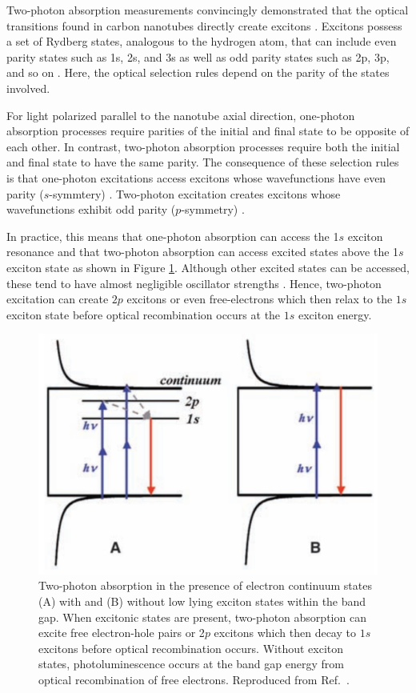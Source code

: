 Two-photon absorption measurements convincingly demonstrated that the optical transitions found in carbon nanotubes directly create excitons \cite{wang2005optical, maultzsch2005exciton}. Excitons possess a set of Rydberg states, analogous to the hydrogen atom, that can include even parity states such as 1s, 2s, and 3s as well as odd parity states such as 2p, 3p, and so on \cite{wang2005optical}. Here, the optical selection rules depend on the parity of the states involved.

For light polarized parallel to the nanotube axial direction, one-photon absorption processes require parities of the initial and final state to be opposite of each other. In contrast, two-photon absorption processes require both the initial and final state to have the same parity. The consequence of these selection rules is that one-photon excitations access excitons whose wavefunctions have even parity ($s$-symmtery) \cite{wang2005optical}. Two-photon excitation creates excitons whose wavefunctions exhibit odd parity ($p$-symmetry) \cite{wang2005optical}.

In practice, this means that one-photon absorption can access the 1$s$ exciton resonance and that two-photon absorption can access excited states above the 1$s$ exciton state as shown in Figure \ref{fig:cnt_two_photon}. Although other excited states can be accessed, these tend to have almost negligible oscillator strengths \cite{wang2005optical}. Hence, two-photon excitation can create $2p$ excitons or even free-electrons which then relax to the $1s$ exciton state before optical recombination occurs at the $1s$ exciton energy.

\begin{figure}[H]
	\centering
	\includegraphics[scale=0.3]{images/chapter_optical_props/cnt_two_photon}
	\caption{ Two-photon absorption in the presence of electron continuum states (A) with and (B) without low lying exciton states within the band gap. When excitonic states are present, two-photon absorption can excite free electron-hole pairs or 2$p$ excitons which then decay to $1s$ excitons before optical recombination occurs. Without exciton states, photoluminescence occurs at the band gap energy from optical recombination of free electrons. Reproduced from Ref.\ \cite{wang2005optical}. }
	\label{fig:cnt_two_photon}
\end{figure}

